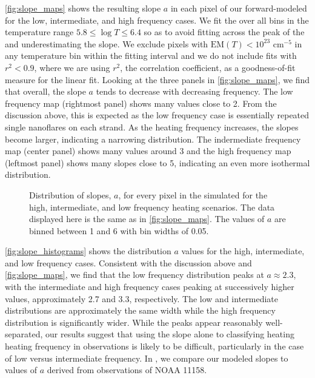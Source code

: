 \autoref{fig:slope_maps} shows the resulting \dem{} slope $a$ in each pixel of our forward-modeled \AR{} for the low, intermediate, and high frequency cases. We fit the \dem{} over all bins in the temperature range $5.8\le\log T\le6.4$ so as to avoid fitting across the peak of the \dem{} and underestimating the slope. We exclude pixels with $\mathrm{EM}(T)<10^{23}$ cm$^{-5}$ in any temperature bin within the fitting interval and we do not include fits with $r^2<0.9$, where we are using $r^2$, the correlation coefficient, as a goodness-of-fit measure for the linear fit. Looking at the three panels in \autoref{fig:slope_maps}, we find that overall, the \dem{} slope $a$ tends to decrease with decreasing frequency. The low frequency map (rightmost panel) shows many values close to 2. From the discussion above, this is expected as the low frequency case is essentially repeated single nanoflares on each strand. As the heating frequency increases, the slopes become larger, indicating a narrowing \dem{} distribution. The indermediate frequency map (center panel) shows many values around 3 and the high frequency map (leftmost panel) shows many slopes close to 5, indicating an even more isothermal distribution. 

\begin{figure}
    \caption{Distribution of \dem{} slopes, $a$, for every pixel in the simulated \AR{} for the high, intermediate, and low frequency heating scenarios. The data displayed here is the same as in \autoref{fig:slope_maps}. The values of $a$ are binned between 1 and 6 with bin widths of 0.05.}
    \label{fig:slope_histograms}
\end{figure}

\autoref{fig:slope_histograms} shows the distribution $a$ values for the high, intermediate, and low frequency cases. Consistent with the discussion above and \autoref{fig:slope_maps}, we find that the low frequency distribution peaks at $a\approx2.3$, with the intermediate and high frequency cases peaking at successively higher values, approximately 2.7 and 3.3, respectively. The low and intermediate distributions are approximately the same width while the high frequency distribution is significantly wider. While the peaks appear reasonably well-separated, our results suggest that using the \dem{} slope alone to classifying heating heating frequency in observations is likely to be difficult, particularly in the case of low versus intermediate frequency. In , we compare our modeled \dem{} slopes to values of $a$ derived from observations of NOAA 11158.


